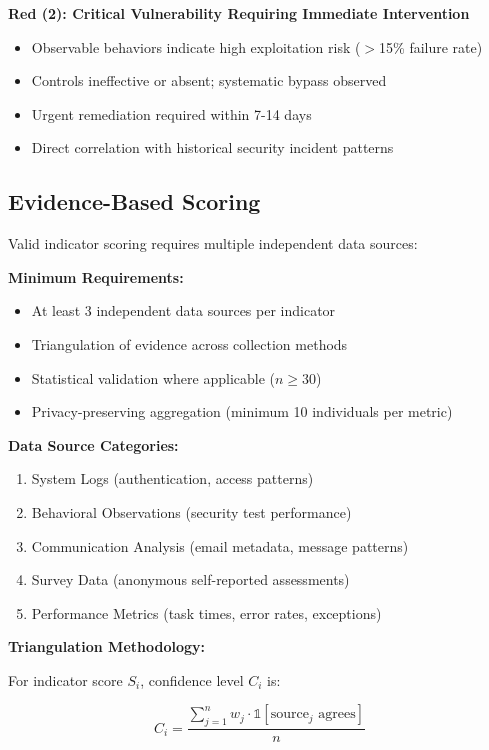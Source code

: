 \documentclass[11pt,a4paper]{article}
\begin{document}
\textbf{Red (2): Critical Vulnerability Requiring Immediate Intervention}
\begin{itemize}
\item Observable behaviors indicate high exploitation risk ($>$15\% failure rate)
\item Controls ineffective or absent; systematic bypass observed
\item Urgent remediation required within 7-14 days
\item Direct correlation with historical security incident patterns
\end{itemize}

\subsection{Evidence-Based Scoring}

Valid indicator scoring requires multiple independent data sources:

\textbf{Minimum Requirements:}
\begin{itemize}
\item At least 3 independent data sources per indicator
\item Triangulation of evidence across collection methods
\item Statistical validation where applicable ($n \geq 30$)
\item Privacy-preserving aggregation (minimum 10 individuals per metric)
\end{itemize}

\textbf{Data Source Categories:}
\begin{enumerate}
\item System Logs (authentication, access patterns)
\item Behavioral Observations (security test performance)
\item Communication Analysis (email metadata, message patterns)
\item Survey Data (anonymous self-reported assessments)
\item Performance Metrics (task times, error rates, exceptions)
\end{enumerate}

\textbf{Triangulation Methodology:}

For indicator score $S_i$, confidence level $C_i$ is:

\begin{equation}
C_i = \frac{\sum_{j=1}^{n} w_j \cdot \mathbb{1}[\text{source}_j \text{ agrees}]}{n}
\end{equation}
\end{document}
